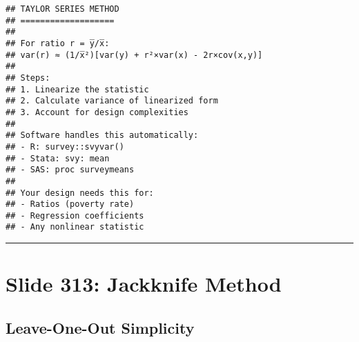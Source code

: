 \documentclass[
]{article}
\begin{document}
\begin{verbatim}
## TAYLOR SERIES METHOD
## ===================
## 
## For ratio r = y̅/x̅:
## var(r) ≈ (1/x̅²)[var(y) + r²×var(x) - 2r×cov(x,y)]
## 
## Steps:
## 1. Linearize the statistic
## 2. Calculate variance of linearized form
## 3. Account for design complexities
## 
## Software handles this automatically:
## - R: survey::svyvar()
## - Stata: svy: mean
## - SAS: proc surveymeans
## 
## Your design needs this for:
## - Ratios (poverty rate)
## - Regression coefficients
## - Any nonlinear statistic
\end{verbatim}

\begin{center}\rule{0.5\linewidth}{0.5pt}\end{center}

\section{Slide 313: Jackknife Method}\label{slide-313-jackknife-method}

\subsection{Leave-One-Out Simplicity}\label{leave-one-out-simplicity}
\end{document}
